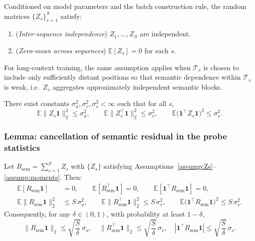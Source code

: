 \begin{assumption}
\label{assump:Zs}
Conditioned on model parameters and the batch construction rule, the random matrices
$\{Z_s\}_{s=1}^S$ satisfy:
\begin{enumerate}
\item (\emph{Inter-sequence independence}) $Z_1,\dots,Z_S$ are independent.
\item (\emph{Zero-mean across sequences}) $\mathbb{E}[Z_s]=0$ for each $s$.
\end{enumerate}
For long-context training, the same assumption applies when $\mathcal{T}_s$ is chosen to
include only sufficiently distant positions so that semantic dependence within $\mathcal{T}_s$
is weak, i.e.\ $Z_s$ aggregates approximately independent semantic blocks.
\end{assumption}

\begin{assumption}
\label{assump:moments}
There exist constants $\sigma_u^2,\sigma_v^2,\sigma_s^2<\infty$ such that for all $s$,
\begin{equation}
\label{eq:moment_bounds}
\mathbb{E}\|Z_s\mathbf{1}\|_2^2 \le \sigma_u^2,
\qquad
\mathbb{E}\|Z_s^\top\mathbf{1}\|_2^2 \le \sigma_v^2,
\qquad
\mathbb{E}\bigl(\mathbf{1}^\top Z_s \mathbf{1}\bigr)^2 \le \sigma_s^2.
\end{equation}
\end{assumption}

\subsubsection{Lemma: cancellation of semantic residual in the probe statistics}

\begin{lemma}
\label{lem:semantic_cancellation}
Let $R_{\mathrm{sem}}=\sum_{s=1}^S Z_s$ with $\{Z_s\}$ satisfying
Assumptions~\ref{assump:Zs}--\ref{assump:moments}. Then:
\begin{align}
\label{eq:cancel_mean}
\mathbb{E}[R_{\mathrm{sem}}\mathbf{1}] &= 0,
\qquad
\mathbb{E}[R_{\mathrm{sem}}^\top\mathbf{1}] = 0,
\qquad
\mathbb{E}[\mathbf{1}^\top R_{\mathrm{sem}}\mathbf{1}] = 0,\\
\label{eq:cancel_second_moment}
\mathbb{E}\|R_{\mathrm{sem}}\mathbf{1}\|_2^2 &\le S\,\sigma_u^2,
\qquad
\mathbb{E}\|R_{\mathrm{sem}}^\top\mathbf{1}\|_2^2 \le S\,\sigma_v^2,
\qquad
\mathbb{E}\bigl(\mathbf{1}^\top R_{\mathrm{sem}}\mathbf{1}\bigr)^2 \le S\,\sigma_s^2.
\end{align}
Consequently, for any $\delta\in(0,1)$, with probability at least $1-\delta$,
\begin{equation}
\label{eq:cancel_hp}
\|R_{\mathrm{sem}}\mathbf{1}\|_2 \le \sqrt{\frac{S}{\delta}}\,\sigma_u,\quad
\|R_{\mathrm{sem}}^\top\mathbf{1}\|_2 \le \sqrt{\frac{S}{\delta}}\,\sigma_v,\quad
|\mathbf{1}^\top R_{\mathrm{sem}}\mathbf{1}| \le \sqrt{\frac{S}{\delta}}\,\sigma_s.
\end{equation}
\end{lemma}

